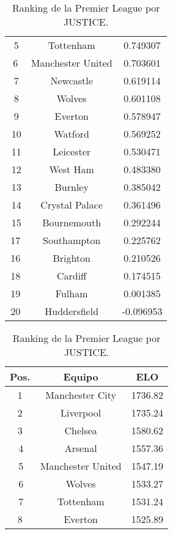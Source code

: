 \documentclass[a4paper]{article}
\newcommand{\bigfatgreen}{\begin{tikzpicture}[x=0.5pt,y=0.6pt,yscale=-.5,xscale=.5]
\draw  [fill=ForestGreen!70,fill opacity=1] (100,123.22) -- (113.25,113) -- (126.5,123.22) -- (119.88,123.22) -- (119.88,138.54) -- (106.63,138.54) -- (106.63,123.22) -- cycle ;
\end{tikzpicture}}
\newcommand{\bigfatred}{\begin{tikzpicture}[x=0.5pt,y=0.6pt,yscale=-.5,xscale=.5, rotate= 180]
\draw  [fill=red!70,fill opacity=1] (100,123.22) -- (113.25,113) -- (126.5,123.22) -- (119.88,123.22) -- (119.88,138.54) -- (106.63,138.54) -- (106.63,123.22) -- cycle ;
\end{tikzpicture}}
\begin{document}
\begin{table}[h]
{\begin{subtable}{0.4\textwidth}
\begin{tabular}{|c|c|c|}
            \bigfatred\,5 & Tottenham & 0.749307 \\
            6 & Manchester United  & 0.703601 \\
            \bigfatgreen\,7 & Newcastle  & 0.619114 \\
            \bigfatred\,8 & Wolves & 0.601108 \\
            \bigfatred\,9 & Everton & 0.578947 \\
            \bigfatgreen\,10 & Watford & 0.569252 \\
            \bigfatred\,11 & Leicester  & 0.530471 \\
            \bigfatred\,12 & West Ham  & 0.483380 \\
            \bigfatgreen\,13 & Burnley & 0.385042 \\
            \bigfatred\,14 & Crystal Palace  & 0.361496 \\
            \bigfatred\,15 & Bournemouth & 0.292244  \\
            17 & Southampton  & 0.225762 \\
            16 & Brighton & 0.210526 \\
            18 & Cardiff  & 0.174515 \\
            19 & Fulham & 0.001385 \\
            20 & Huddersfield & -0.096953 \\
            \hline
        \end{tabular}
        \caption{Ranking de la Premier League por JUSTICE.}
        \label{subtab:EFL_alg_justice}
    \end{subtable}%
    \begin{subtable}{0.4\textwidth}
        \centering
        \begin{tabular}{|c|c|c|}
            \hline
        	Pos. & Equipo & ELO  \\
        	\hline
            1 & Manchester City & 1736.82  \\
            2 & Liverpool & 1735.24  \\
            3 & Chelsea  & 1580.62 \\
            \bigfatgreen\,4 & Arsenal & 1557.36 \\
            \bigfatgreen\,5 & Manchester United  & 1547.19 \\
            \bigfatgreen\,6 & Wolves & 1533.27 \\
            \bigfatred\,7 & Tottenham & 1531.24 \\
            8 & Everton & 1525.89 \\

\end{tabular}
\end{subtable}}
\end{table}
\end{document}
